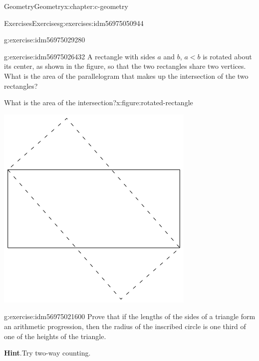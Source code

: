 \documentclass[twoside,10pt,]{book}
\newcommand{\blocktitlefont}{\relax}
\numberwithin{equation}{section}
\newcommand{\lt}{<}
\begin{document}
\begin{chapterptx}{Geometry}{}{Geometry}{}{}{x:chapter:c-geometry}
\begin{exercises-section}{Exercises}{}{Exercises}{}{}{g:exercises:idm56975050944}
\begin{divisionexercise}{3}{}{}{g:exercise:idm56975029280}
\end{divisionexercise}%
\begin{divisionexercise}{4}{}{}{g:exercise:idm56975026432}%
A rectangle with sides \(a\) and \(b\), \(a \lt b\) is rotated about its center, as shown in the figure, so that the two rectangles share two vertices. What is the area of the parallelogram that makes up the intersection of the two rectangles?%
\begin{figureptx}{What is the area of the intersection?}{x:figure:rotated-rectangle}{}%
\begin{image}{0.2}{0.6}{0.2}%
\includegraphics[width=\linewidth]{images/rotated-rectangle.png}
\end{image}%
\tcblower
\end{figureptx}%
\end{divisionexercise}%
\begin{divisionexercise}{5}{}{}{g:exercise:idm56975021600}%
Prove that if the lengths of the sides of a triangle form an arithmetic progression, then the radius of the inscribed circle is one third of one of the heights of the triangle.%
\par\smallskip%
\noindent\textbf{\blocktitlefont Hint}.\hypertarget{g:hint:idm56975017136}{}\quad{}Try two-way counting.%
\end{divisionexercise}%

\end{exercises-section}
\end{chapterptx}
\end{document}
